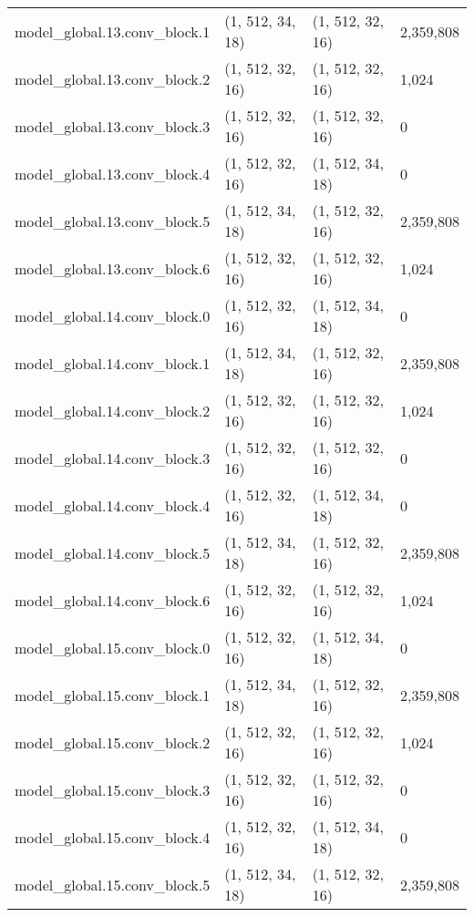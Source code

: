 \begin{longtable}{llll}
        model\_global.13.conv\_block.1 &   (1, 512, 34, 18) &   (1, 512, 32, 16) &   2,359,808 \\
        model\_global.13.conv\_block.2 &   (1, 512, 32, 16) &   (1, 512, 32, 16) &       1,024 \\
        model\_global.13.conv\_block.3 &   (1, 512, 32, 16) &   (1, 512, 32, 16) &           0 \\
        model\_global.13.conv\_block.4 &   (1, 512, 32, 16) &   (1, 512, 34, 18) &           0 \\
        model\_global.13.conv\_block.5 &   (1, 512, 34, 18) &   (1, 512, 32, 16) &   2,359,808 \\
        model\_global.13.conv\_block.6 &   (1, 512, 32, 16) &   (1, 512, 32, 16) &       1,024 \\
        model\_global.14.conv\_block.0 &   (1, 512, 32, 16) &   (1, 512, 34, 18) &           0 \\
        model\_global.14.conv\_block.1 &   (1, 512, 34, 18) &   (1, 512, 32, 16) &   2,359,808 \\
        model\_global.14.conv\_block.2 &   (1, 512, 32, 16) &   (1, 512, 32, 16) &       1,024 \\
        model\_global.14.conv\_block.3 &   (1, 512, 32, 16) &   (1, 512, 32, 16) &           0 \\
        model\_global.14.conv\_block.4 &   (1, 512, 32, 16) &   (1, 512, 34, 18) &           0 \\
        model\_global.14.conv\_block.5 &   (1, 512, 34, 18) &   (1, 512, 32, 16) &   2,359,808 \\
        model\_global.14.conv\_block.6 &   (1, 512, 32, 16) &   (1, 512, 32, 16) &       1,024 \\
        model\_global.15.conv\_block.0 &   (1, 512, 32, 16) &   (1, 512, 34, 18) &           0 \\
        model\_global.15.conv\_block.1 &   (1, 512, 34, 18) &   (1, 512, 32, 16) &   2,359,808 \\
        model\_global.15.conv\_block.2 &   (1, 512, 32, 16) &   (1, 512, 32, 16) &       1,024 \\
        model\_global.15.conv\_block.3 &   (1, 512, 32, 16) &   (1, 512, 32, 16) &           0 \\
        model\_global.15.conv\_block.4 &   (1, 512, 32, 16) &   (1, 512, 34, 18) &           0 \\
        model\_global.15.conv\_block.5 &   (1, 512, 34, 18) &   (1, 512, 32, 16) &   2,359,808 \\

\end{longtable}
